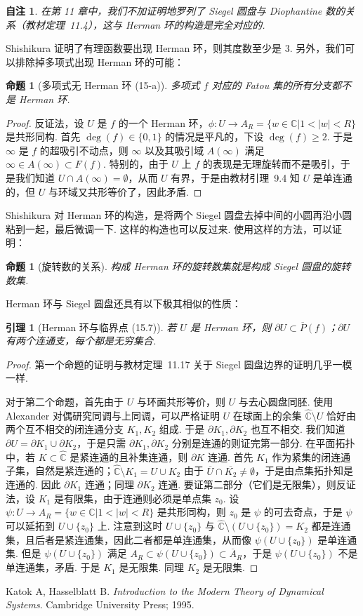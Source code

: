 \documentclass[11pt, a4paper, oneside]{ctexart}
\newtheorem{lemma}[theorem]{引理}
\newtheorem{note}[theorem]{自注}
\newtheorem{proposition}[theorem]{命题}
\newcommand{\C}{\mathbb{C}}
\newcommand{\abs}[1]{\left|{#1}\right|}
\begin{document}
    \begin{note}
        在第 11 章中，我们不加证明地罗列了 Siegel 圆盘与 Diophantine 数的关系（教材定理~11.4），这与 Herman 环的构造是完全对应的.
    \end{note}
    Shishikura 证明了有理函数要出现 Herman 环，则其度数至少是 $3$. 另外，我们可以排除掉多项式出现 Herman 环的可能：
    \begin{proposition}[多项式无 Herman 环 (15-a)]
        多项式 $f$ 对应的 Fatou 集的所有分支都不是 Herman 环.
    \end{proposition}
    \begin{proof}
        反证法，设 $U$ 是 $f$ 的一个 Herman 环，$\phi:U\to A_R=\{w\in \C|1<\abs{w}<R\}$ 是共形同构. 首先 $\deg(f)\in\{0,1\}$ 的情况是平凡的，下设 $\deg(f)\geq 2$. 于是 $\infty$ 是 $f$ 的超吸引不动点，则 $\infty$ 以及其吸引域 $A(\infty)$ 满足 $\infty\in A(\infty)\subset F(f)$. 特别的，由于 $U$ 上 $f$ 的表现是无理旋转而不是吸引，于是我们知道 $U\cap A(\infty)=\emptyset$，从而 $U$ 有界，于是由教材引理~9.4 知 $U$ 是单连通的，但 $U$ 与环域又共形等价了，因此矛盾.
    \end{proof}

    Shishikura 对 Herman 环的构造，是将两个 Siegel 圆盘去掉中间的小圆再沿小圆粘到一起，最后微调一下. 这样的构造也可以反过来. 使用这样的方法，可以证明：
    \begin{proposition}[旋转数的关系]
        构成 Herman 环的旋转数集就是构成 Siegel 圆盘的旋转数集.
    \end{proposition}

    Herman 环与 Siegel 圆盘还具有以下极其相似的性质：
    \begin{lemma}[Herman 环与临界点 (15.7)]
        若 $U$ 是 Herman 环，则 $\partial U\subset \overline{P}(f)$；$\partial U$ 有两个连通支，每个都是无穷集合.
    \end{lemma}
    \begin{proof}
        第一个命题的证明与教材定理~11.17 关于 Siegel 圆盘边界的证明几乎一模一样.

        对于第二个命题，首先由于 $U$ 与环面共形等价，则 $U$ 与去心圆盘同胚. 使用 Alexander 对偶研究同调与上同调，可以严格证明 $U$ 在球面上的余集 $\hat{\C}\setminus U$ 恰好由两个互不相交的闭连通分支 $K_1,K_2$ 组成. 于是 $\partial K_1,\partial K_2$ 也互不相交. 我们知道 $\partial U=\partial K_1\cup \partial K_2$，于是只需 $\partial K_1,\partial K_2$ 分别是连通的则证完第一部分. 在平面拓扑中，若 $K\subset \hat{\C}$ 是紧连通的且补集连通，则 $\partial K$ 连通. 首先 $K_1$ 作为紧集的闭连通子集，自然是紧连通的；$\hat{\C}\setminus K_1=U\cup K_2$ 由于 $\overline{U}\cap \overline{K_2}\neq\emptyset$，于是由点集拓扑知是连通的. 因此 $\partial K_1$ 连通；同理 $\partial K_2$ 连通. 要证第二部分（它们是无限集），则反证法，设 $K_1$ 是有限集，由于连通则必须是单点集 $z_0$. 设 $\psi:U\to A_R=\{w\in \C|1<\abs{w}<R\}$ 是共形同构，则 $z_0$ 是 $\psi$ 的可去奇点，于是 $\psi$ 可以延拓到 $U\cup \{z_0\}$ 上. 注意到这时 $U\cup \{z_0\}$ 与 $\hat{\C}\setminus(U\cup \{z_0\})=K_2$ 都是连通集，且后者是紧连通集，因此二者都是单连通集，从而像 $\psi(U\cup \{z_0\})$ 是单连通集. 但是 $\psi(U\cup \{z_0\})$ 满足 $A_R\subset \psi(U\cup \{z_0\})\subset \overline{A}_R$，于是 $\psi(U\cup \{z_0\})$ 不是单连通集，矛盾. 于是 $K_1$ 是无限集. 同理 $K_2$ 是无限集.
    \end{proof}

    \begin{thebibliography}{}
        Katok A, Hasselblatt B. \emph{Introduction to the Modern Theory of Dynamical Systems}. Cambridge University Press; 1995.
    \end{thebibliography}
\end{document}
